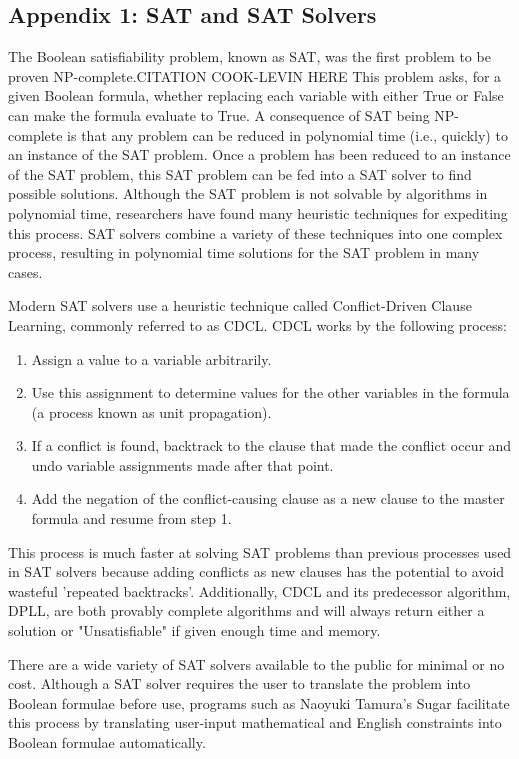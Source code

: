 \documentclass[jou,apacite]{apa6}
\begin{document}
\subsection{Appendix 1: SAT and SAT Solvers}

The Boolean satisfiability problem, known as SAT, was the first problem to be proven NP-complete.CITATION COOK-LEVIN HERE This problem asks, for a given Boolean formula, whether replacing each variable with either True or False can make the formula evaluate to True.   A consequence of SAT being NP-complete is that any problem can be reduced in polynomial time (i.e., quickly) to an instance of the SAT problem. Once a problem has been reduced to an instance of the SAT problem, this SAT problem can be fed into a SAT solver to find possible solutions. Although the SAT problem is not solvable by algorithms in polynomial time, researchers have found many heuristic techniques for expediting this process. SAT solvers combine a variety of these techniques into one complex process, resulting in polynomial time solutions for the SAT problem in many cases.

Modern SAT solvers use a heuristic technique called Conflict-Driven Clause Learning, commonly referred to as CDCL. CDCL works by the following process:

\begin{enumerate}

\item Assign a value to a variable arbitrarily.
\item Use this assignment to determine values for the other variables in the formula (a process known as unit propagation).
\item If a conflict is found, backtrack to the clause that made the conflict occur and undo variable assignments made after that point.
\item Add the negation of the conflict-causing clause as a new clause to the master formula and resume from step 1.

\end{enumerate}

This process is much faster at solving SAT problems than previous processes used in SAT solvers because adding conflicts as new clauses has the potential to avoid wasteful 'repeated backtracks'. Additionally, CDCL and its predecessor algorithm, DPLL, are both provably complete algorithms and will always return either a solution or "Unsatisfiable" if given enough time and memory.

There are a wide variety of SAT solvers available to the public for minimal or no cost. Although a SAT solver requires the user to translate the problem into Boolean formulae before use,  programs such as Naoyuki Tamura's Sugar facilitate this process by translating user-input mathematical and English constraints into Boolean formulae automatically.
\end{document}
